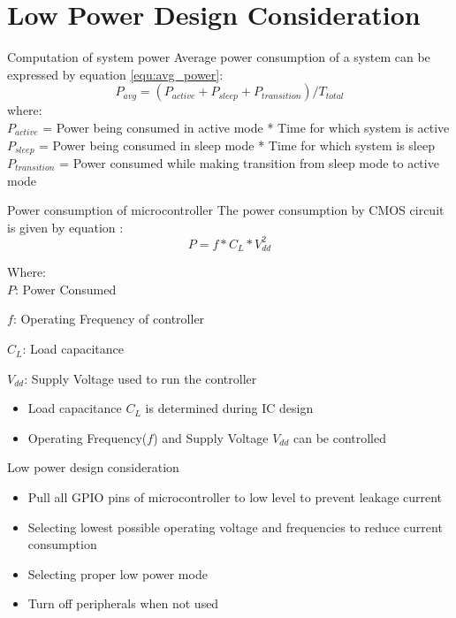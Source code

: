 \documentclass[t]{beamer} %
\begin{document}
\section{Low Power Design Consideration}
\begin{frame}{Computation of system power}
Average power consumption of a system can be expressed by equation \ref{equ:avg_power}:
\begin{equation}
	P_{avg} = (P_{active} + P_{sleep} + P_{transition})/T_{total}
    \label{equ:avg_power}
\end{equation}	
where: \\[0.5cm]
	$P_{active}$ = Power being consumed in active mode * Time for which system is active \\
    $P_{sleep}$ = Power being consumed in sleep mode * Time for which system is sleep \\
    $P_{transition}$ = Power consumed while making transition from sleep mode to active mode \\

\end{frame}

\begin{frame}{Power consumption of microcontroller}
The power consumption by CMOS circuit is given by equation \cite{sanam_MTP report}:
\begin{equation}
	 P = f*C_L*V_{dd}^2
     \label{equ:cmos_power}
\end{equation}

Where: \\
	$P$: Power Consumed 
    
    $f$: Operating Frequency of controller
    
    $C_L$: Load capacitance
    
    $V_{dd}$: Supply Voltage used to run the controller \\[0.5cm]
    
\begin{itemize}
\item Load capacitance $C_L$ is determined during IC design
\item Operating Frequency($f$) and Supply Voltage $V_{dd}$ can be controlled
\end{itemize}
\end{frame}

\begin{frame}{Low power design consideration }
\begin{itemize}
\item Pull all GPIO pins of microcontroller to low level to prevent leakage current \\ [0.5cm]
\item Selecting lowest possible operating voltage and frequencies to reduce current consumption \\[0.5cm]
\item Selecting proper low power mode \\[0.5cm]
\item Turn off peripherals when not used
\end{itemize}
\end{frame}
\end{document}

